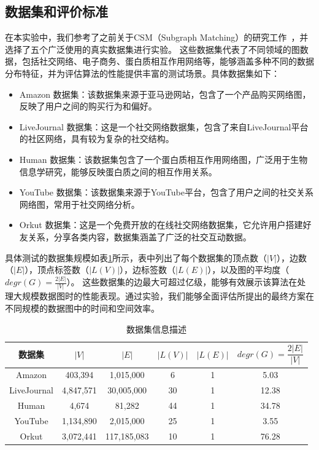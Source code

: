 \subsection{数据集和评价标准}
\label{ss-sec:dataset}
在本实验中，我们参考了之前关于CSM（Subgraph Matching）的研究工作~\cite{csm-survey:DBLP:journals/pvldb/SunSLH22,static-sm:DBLP:conf/sigmod/Sun020}，并选择了五个广泛使用的真实数据集进行实验。
这些数据集代表了不同领域的图数据，包括社交网络、电子商务、蛋白质相互作用网络等，能够涵盖多种不同的数据分布特征，并为评估算法的性能提供丰富的测试场景。具体数据集如下：
\begin{itemize}
\item Amazon 数据集：该数据集来源于亚马逊网站，包含了一个产品购买网络图，反映了用户之间的购买行为和偏好。
\item LiveJournal 数据集：这是一个社交网络数据集，包含了来自LiveJournal平台的社区网络，具有较为复杂的社交结构。
\item Human 数据集：该数据集包含了一个蛋白质相互作用网络图，广泛用于生物信息学研究，能够反映蛋白质之间的相互作用关系。
\item YouTube 数据集：该数据集来源于YouTube平台，包含了用户之间的社交关系网络图，常用于社交网络分析。
\item Orkut 数据集：这是一个免费开放的在线社交网络数据集，它允许用户搭建好友关系，分享各类内容，数据集涵盖了广泛的社交互动数据。
\end{itemize}   

具体测试的数据集规模如表\ref{table:dataset}所示，表中列出了每个数据集的顶点数（$|V|$），边数（$|E|$），顶点标签数（$|L(V)|$），边标签数（$|L(E)|$），以及图的平均度（$degr(G)=\frac{2|E|}{|V|}$）。
这些数据集的边最大可超过亿级，能够有效展示该算法在处理大规模数据图时的性能表现。通过实验，我们能够全面评估所提出的最终方案在不同规模的数据图中的时间和空间效率。

\begin{table}[H]
    \centering
    \caption{数据集信息描述}
    \label{table:dataset}
    \begin{tabular}{cccccc}
        \toprule
        数据集   & $|V|$  & $|E|$ & $|L(V)|$ & $ |L(E)|$ & $degr(G)=\dfrac{2|E|}{|V|}$\\
        \midrule
        Amazon    & 403,394 & 1,015,000 & 6 & 1 & 5.03     \\ 
        LiveJournal   & 4,847,571 & 30,005,000 & 30 & 1 & 12.38 \\ 
        Human  & 4,674 & 81,282  & 44 & 1 & 34.78   \\ 
        YouTube  & 1,134,890 & 2,015,000 & 25 & 1 & 3.55  \\ 
        Orkut  & 3,072,441 & 117,185,083 & 10 & 1 & 76.28  \\ 
        \bottomrule
    \end{tabular}
\end{table}

